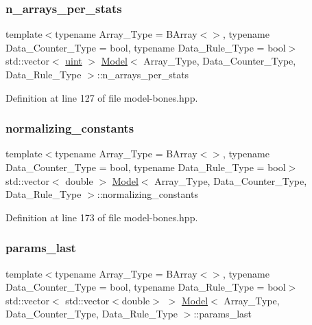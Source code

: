 \subsubsection{\texorpdfstring{n\+\_\+arrays\+\_\+per\+\_\+stats}{n\_arrays\_per\_stats}}
{\footnotesize\ttfamily template$<$typename Array\+\_\+\+Type = B\+Array$<$$>$, typename Data\+\_\+\+Counter\+\_\+\+Type = bool, typename Data\+\_\+\+Rule\+\_\+\+Type = bool$>$ \\
std\+::vector$<$ \hyperlink{typedefs_8hpp_a91ad9478d81a7aaf2593e8d9c3d06a14}{uint} $>$ \hyperlink{class_model}{Model}$<$ Array\+\_\+\+Type, Data\+\_\+\+Counter\+\_\+\+Type, Data\+\_\+\+Rule\+\_\+\+Type $>$\+::n\+\_\+arrays\+\_\+per\+\_\+stats}



Definition at line 127 of file model-\/bones.\+hpp.

\mbox{\label{class_model_aa4479d146005e89350dad6ba7bd8121a}} 
\subsubsection{\texorpdfstring{normalizing\+\_\+constants}{normalizing\_constants}}
{\footnotesize\ttfamily template$<$typename Array\+\_\+\+Type = B\+Array$<$$>$, typename Data\+\_\+\+Counter\+\_\+\+Type = bool, typename Data\+\_\+\+Rule\+\_\+\+Type = bool$>$ \\
std\+::vector$<$ double $>$ \hyperlink{class_model}{Model}$<$ Array\+\_\+\+Type, Data\+\_\+\+Counter\+\_\+\+Type, Data\+\_\+\+Rule\+\_\+\+Type $>$\+::normalizing\+\_\+constants}



Definition at line 173 of file model-\/bones.\+hpp.

\mbox{\label{class_model_add8183af946f2871480b6a6f9f1c8013}} 
\subsubsection{\texorpdfstring{params\+\_\+last}{params\_last}}
{\footnotesize\ttfamily template$<$typename Array\+\_\+\+Type = B\+Array$<$$>$, typename Data\+\_\+\+Counter\+\_\+\+Type = bool, typename Data\+\_\+\+Rule\+\_\+\+Type = bool$>$ \\
std\+::vector$<$ std\+::vector$<$double$>$ $>$ \hyperlink{class_model}{Model}$<$ Array\+\_\+\+Type, Data\+\_\+\+Counter\+\_\+\+Type, Data\+\_\+\+Rule\+\_\+\+Type $>$\+::params\+\_\+last}



